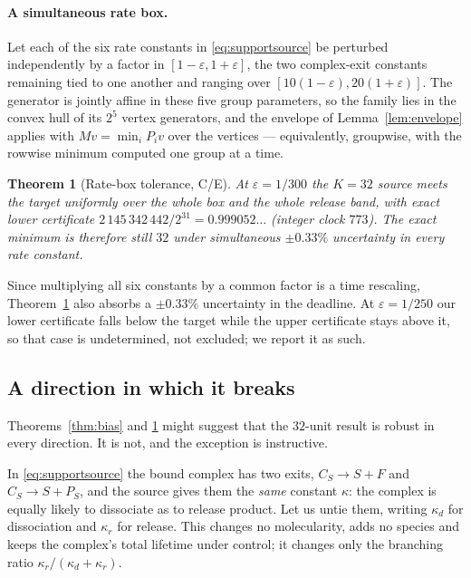 \documentclass[11pt]{article}
\theoremstyle{plain}
\newtheorem{theorem}{Theorem}[section]
\theoremstyle{definition}
\theoremstyle{remark}
\begin{document}
\paragraph{A simultaneous rate box.} Let each of the six rate constants in
\eqref{eq:supportsource} be perturbed independently by a factor in
$[1-\varepsilon,1+\varepsilon]$, the two complex-exit constants remaining tied
to one another and ranging over $[10(1-\varepsilon),20(1+\varepsilon)]$. The
generator is jointly affine in these five group parameters, so the family lies
in the convex hull of its $2^{5}$ vertex generators, and the envelope of
Lemma~\ref{lem:envelope} applies with $Mv=\min_i P_iv$ over the vertices ---
equivalently, groupwise, with the rowwise minimum computed one group at a
time.

\begin{theorem}[Rate-box tolerance, C/E]\label{thm:box}
At $\varepsilon=1/300$ the $K=32$ source meets the target uniformly over the
whole box and the whole release band, with exact lower certificate
$2\,145\,342\,442/2^{31}=0.999052\ldots$ (integer clock $773$). The exact
minimum is therefore still $32$ under simultaneous $\pm0.33\%$ uncertainty in
every rate constant.
\end{theorem}

Since multiplying all six constants by a common factor is a time rescaling,
Theorem~\ref{thm:box} also absorbs a $\pm0.33\%$ uncertainty in the deadline.
At $\varepsilon=1/250$ our lower certificate falls below the target while the
upper certificate stays above it, so that case is undetermined, not excluded;
we report it as such.

\subsection{A direction in which it breaks}\label{sec:branching}

Theorems~\ref{thm:bias} and \ref{thm:box} might suggest that the $32$-unit
result is robust in every direction. It is not, and the exception is
instructive.

In \eqref{eq:supportsource} the bound complex has two exits, $C_S\to S+F$ and
$C_S\to S+P_S$, and the source gives them the \emph{same} constant $\kappa$:
the complex is equally likely to dissociate as to release product. Let us
untie them, writing $\kappa_d$ for dissociation and $\kappa_r$ for release.
This changes no molecularity, adds no species and keeps the complex's total
lifetime under control; it changes only the branching ratio
$\kappa_r/(\kappa_d+\kappa_r)$.
\end{document}
